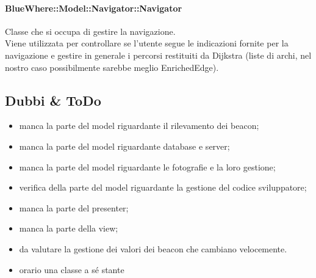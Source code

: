 \documentclass[../SpecificaTecnica.tex]{subfiles}
\begin{document}
				\paragraph{BlueWhere::Model::Navigator::Navigator}
					Classe che si occupa di gestire la navigazione. \\
					Viene utilizzata per controllare se l'utente segue le indicazioni fornite per la navigazione e gestire in generale i percorsi restituiti da Dijkstra (liste di archi, nel nostro caso possibilmente sarebbe meglio EnrichedEdge).

	\subsection{Dubbi \& ToDo}
		\begin{itemize}
			\item manca la parte del model riguardante il rilevamento dei beacon;
			\item manca la parte del model riguardante database e server;
			\item manca la parte del model riguardante le fotografie e la loro gestione;
			\item verifica della parte del model riguardante la gestione del codice sviluppatore;
			\item manca la parte del presenter;
			\item manca la parte della view;
			\item da valutare la gestione dei valori dei beacon che cambiano velocemente.
			\item orario una classe a sé stante
		\end{itemize}
\end{document}
